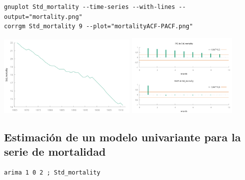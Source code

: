 \documentclass[10pt]{article}
\begin{document}
\begin{verbatim}
gnuplot Std_mortality --time-series --with-lines --output="mortality.png"
corrgm Std_mortality 9 --plot="mortalityACF-PACF.png"
\end{verbatim}


\begin{center}
\includegraphics[width=0.5\textwidth]{./mortality-marriages/mortality.png} 
\includegraphics[width=0.4\textwidth]{./mortality-marriages/mortalityACF-PACF.png} 
\end{center}
\subsection*{Estimación de un modelo univariante para la serie de mortalidad}
\label{sec:org479a248}

\begin{verbatim}
arima 1 0 2 ; Std_mortality
\end{verbatim}
\end{document}
